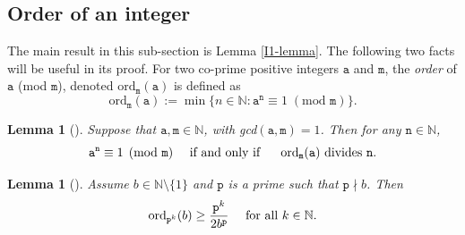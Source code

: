\documentclass[12pt, twoside]{article}
\newtheorem{lemma}[theorem]{Lemma}
\theoremstyle{definition}
\numberwithin{equation}{section}
\begin{document}
\subsection{Order of an integer} \label{integer-order-section} 
The main result in this sub-section is Lemma \ref{I1-lemma}. The following two facts will be useful in its proof. For two co-prime positive integers $\mathtt a$ and $\mathtt m$, the {\em{order}} of $\mathtt a$ (mod $\mathtt m$), denoted $\text{ord}_{\mathtt m}(\mathtt a)$ is defined as 
\begin{equation} 
\text{ord}_{\mathtt m}(\mathtt a) := \min\bigl\{n \in \mathbb N: {\mathtt a}^{\mathtt n} \equiv 1 \; (\text{mod } \mathtt m) \bigr\}. 
\end{equation}   
\begin{lemma}[{\cite[Theorem 88]{hw08}}] \label{hw-lemma} 
Suppose that $\mathtt a, \mathtt m \in \mathbb N$, with {\rm gcd}$(\mathtt a, \mathtt m) = 1$. Then for any $\mathtt n \in \mathbb N$, 
\begin{equation*} 
\mathtt a^{\mathtt n} \equiv 1 \pmod {\mathtt m} 
 \quad \text{ if and only if } \quad \text{ \rm ord}_{\mathtt m}(\mathtt a) \text{ divides } \mathtt n.  
\end{equation*} 
\end{lemma} 
\begin{lemma}[{\cite[Lemma 4]{s60}}] \label{Schmidt-lemma-1}
Assume $b \in \mathbb N \setminus \{1\}$ and $\mathtt p$ is a prime such that $\mathtt p \nmid b$. Then  
\begin{equation} \label{ord-lower-bound} 
\text{\rm ord}_{\mathtt p^k}(b) \geq \frac{\mathtt p^{k}}{2b^{\mathtt p}} \quad \text{ for all } k \in \mathbb N. 
\end{equation} 
\end{lemma} 
\end{document}
